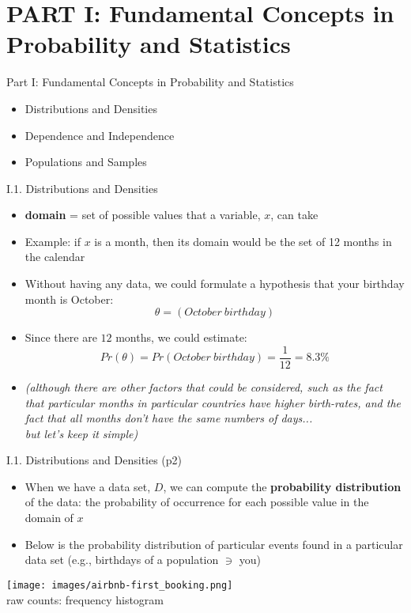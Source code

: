 \documentclass[handout]{beamer}
\newcommand{\strong}[1]{\textbf{\color{teal} #1}}
\newcommand{\stronger}[1]{\textbf{\color{purple} #1}}
\begin{document}
\section{PART I: Fundamental Concepts in Probability and Statistics}
\begin{frame}{Part I: Fundamental Concepts in Probability and Statistics}
\begin{itemize}
\item[I.1.] Distributions and Densities
\item[I.2.] Dependence and Independence
\item[I.3.] Populations and Samples
\end{itemize}
\end{frame}
\begin{frame}{I.1. Distributions and Densities}
\begin{itemize}
\item \strong{domain} = set of possible values that a variable, $x$, can take
\item Example: if $x$ is a month, then its domain would be the set of 12 months in the calendar
\item Without having any data, we could formulate a hypothesis that your birthday month is October:
\[
\theta = (October ~ birthday)
\]
\item Since there are $12$ months, we could estimate:
\[
Pr(\theta) = Pr(October ~ birthday) = \frac{1}{12} = 8.3\%
\]
\item[] \emph{\footnotesize (although there are other factors that could be considered, such as the fact that particular months in particular countries have higher birth-rates, and the fact that all months don't have the same numbers of days...\\ but let's keep it simple)}
\end{itemize}
\end{frame}
\begin{frame}{I.1. Distributions and Densities (p2)}
\begin{itemize}
\item When we have a data set, $D$, we can compute the \stronger{probability distribution} of the data: the probability of occurrence for each possible value in the domain of $x$
\item Below is the probability distribution of particular events found in a particular data set (e.g., birthdays of a population $\ni$ you)
\end{itemize}
\begin{center}
\texttt{[image: images/airbnb-first\_booking.png]} \\
{\footnotesize raw counts: frequency histogram}
\end{center}
\end{frame}
\end{document}

